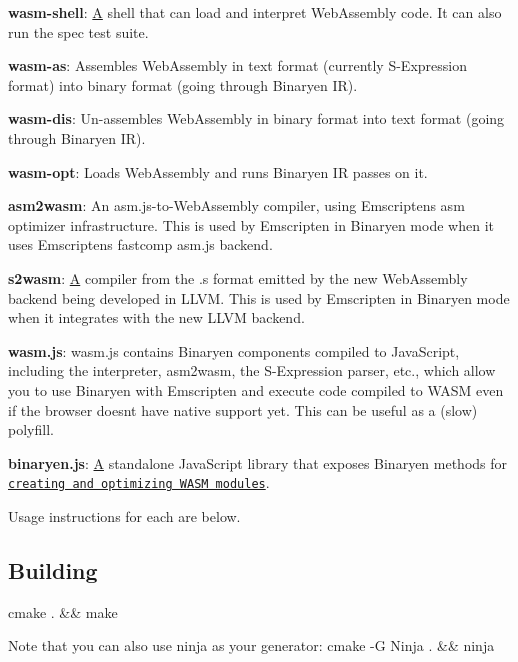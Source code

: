 \begin{DoxyItemize}
\item {\bfseries wasm-\/shell}\+: \mbox{\hyperlink{struct_a}{A}} shell that can load and interpret Web\+Assembly code. It can also run the spec test suite.
\item {\bfseries wasm-\/as}\+: Assembles Web\+Assembly in text format (currently S-\/\+Expression format) into binary format (going through Binaryen IR).
\item {\bfseries wasm-\/dis}\+: Un-\/assembles Web\+Assembly in binary format into text format (going through Binaryen IR).
\item {\bfseries wasm-\/opt}\+: Loads Web\+Assembly and runs Binaryen IR passes on it.
\item {\bfseries asm2wasm}\+: An asm.\+js-\/to-\/\+Web\+Assembly compiler, using Emscripten\textquotesingle{}s asm optimizer infrastructure. This is used by Emscripten in Binaryen mode when it uses Emscripten\textquotesingle{}s fastcomp asm.\+js backend.
\item {\bfseries s2wasm}\+: \mbox{\hyperlink{struct_a}{A}} compiler from the {\ttfamily .s} format emitted by the new Web\+Assembly backend being developed in L\+L\+VM. This is used by Emscripten in Binaryen mode when it integrates with the new L\+L\+VM backend.
\item {\bfseries wasm.\+js}\+: wasm.\+js contains Binaryen components compiled to Java\+Script, including the interpreter, {\ttfamily asm2wasm}, the S-\/\+Expression parser, etc., which allow you to use Binaryen with Emscripten and execute code compiled to W\+A\+SM even if the browser doesn\textquotesingle{}t have native support yet. This can be useful as a (slow) polyfill.
\item {\bfseries binaryen.\+js}\+: \mbox{\hyperlink{struct_a}{A}} standalone Java\+Script library that exposes Binaryen methods for \href{https://github.com/WebAssembly/binaryen/blob/master/test/binaryen.js/test.js}{\tt creating and optimizing W\+A\+SM modules}.
\end{DoxyItemize}

Usage instructions for each are below.

\subsection*{Building}


\begin{DoxyCode}
cmake . && make
\end{DoxyCode}
 Note that you can also use {\ttfamily ninja} as your generator\+: {\ttfamily cmake -\/G Ninja . \&\& ninja}


